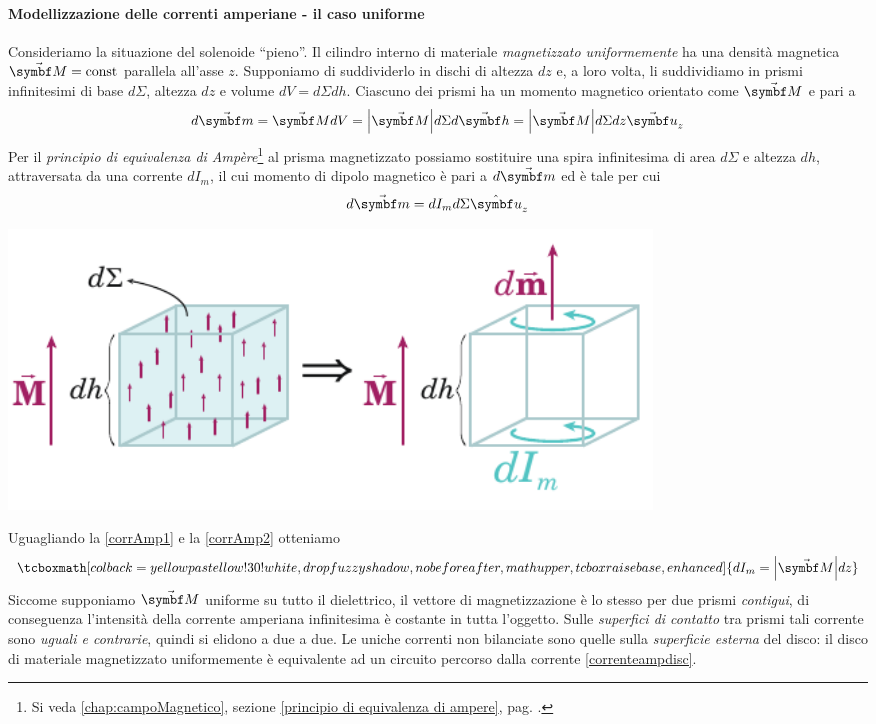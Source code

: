 \paragraph{Modellizzazione delle correnti amperiane - il caso uniforme}
Consideriamo la situazione del solenoide ``pieno''. Il cilindro interno di materiale \textit{magnetizzato uniformemente} ha una densità magnetica $\vba{M}=\text{const}$ parallela all'asse $z$. Supponiamo di suddividerlo in dischi di altezza $dz$ e, a loro volta, li suddividiamo in prismi infinitesimi di base $d\Sigma$, altezza $dz$ e volume $dV=d\Sigma dh$. Ciascuno dei prismi ha un momento magnetico orientato come $\vba{M}$ e pari a
\begin{equation*}
	d\vba{m}=\vba{M}dV=\abs{\vba{M}}d\Sigma d\vba{h}=\abs{\vba{M}} d\Sigma dz\vba{u}_z\label{corrAmp1}
\end{equation*}
Per il \textit{principio di equivalenza di Ampère}\footnote{Si veda \autoref{chap:campoMagnetico}, sezione \ref{principio di equivalenza di ampere}, pag. \pageref{principio di equivalenza di ampere}.} al prisma magnetizzato possiamo sostituire una spira infinitesima di area $d\Sigma$ e altezza $dh$, attraversata da una corrente $dI_m$, il cui momento di dipolo magnetico è pari a $d\vba{m}$ ed è tale per cui
\begin{equation*}
	d\vba{m}=dI_md\Sigma \vbh{u}_z \label{corrAmp2}
\end{equation*}
\begin{center}
	\includegraphics[width=0.75\textwidth]{images/chp12/chp12momento1.pdf}
\end{center}
Uguagliando la \eqref{corrAmp1} e la \eqref{corrAmp2} otteniamo
\begin{equation}
	\tcboxmath[colback=yellowpastellow!30!white,drop fuzzy shadow, nobeforeafter, math upper, tcbox raise base, enhanced]{dI_m=\abs{\vba{M}}dz}\label{correnteampdisc}
\end{equation}
Siccome supponiamo $\vba{M}$ uniforme su tutto il dielettrico, il vettore di magnetizzazione è lo stesso per due prismi \textit{contigui}, di conseguenza l'intensità della corrente amperiana infinitesima è costante in tutta l'oggetto. Sulle \textit{superfici di contatto} tra prismi tali corrente sono \textit{uguali e contrarie}, quindi si elidono a due a due. Le uniche correnti non bilanciate sono quelle sulla \textit{superficie esterna} del disco: il disco di materiale magnetizzato uniformemente è equivalente ad un circuito percorso dalla corrente \eqref{correnteampdisc}.
